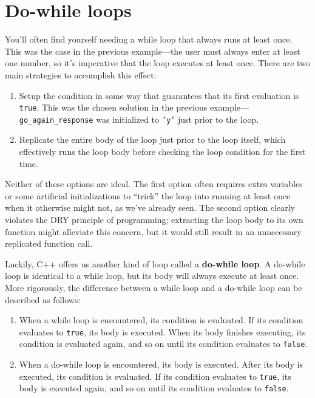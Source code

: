 \documentclass{article}
\begin{document}
\section{Do-while loops}

You'll often find yourself needing a while loop that always runs at least once. This was the case in the previous example---the user must always enter at least one number, so it's imperative that the loop executes at least once. There are two main strategies to accomplish this effect:

\begin{enumerate}
    \item Setup the condition in some way that guarantees that its first evaluation is \texttt{true}. This was the chosen solution in the previous example---\texttt{go\_again\_response} was initialized to \texttt{'y'} just prior to the loop.
    \item Replicate the entire body of the loop just prior to the loop itself, which effectively runs the loop body before checking the loop condition for the first time.
\end{enumerate}

Neither of these options are ideal. The first option often requires extra variables or some artificial initializations to ``trick'' the loop into running at least once when it otherwise might not, as we've already seen. The second option clearly violates the DRY principle of programming; extracting the loop body to its own function might alleviate this concern, but it would still result in an unnecessary replicated function call.

Luckily, C++ offers us another kind of loop called a \textbf{do-while loop}. A do-while loop is identical to a while loop, but its body will always execute at least once. More rigorously, the difference between a while loop and a do-while loop can be described as follows:

\begin{enumerate}
    \item When a while loop is encountered, its condition is evaluated. If its condition evaluates to \texttt{true}, its body is executed. When its body finishes executing, its condition is evaluated again, and so on until its condition evaluates to \texttt{false}.
    \item When a do-while loop is encountered, its body is executed. After its body is executed, its condition is evaluated. If its condition evaluates to \texttt{true}, its body is executed again, and so on until its condition evaluates to \texttt{false}.
\end{enumerate}
\end{document}
